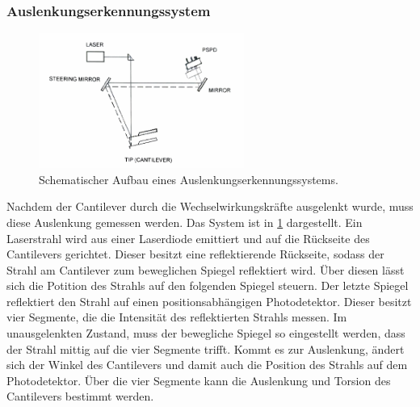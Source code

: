 \subsubsection{Auslenkungserkennungssystem}
\begin{figure}
    \centering
    \includegraphics[width=0.6\textwidth]{../assets/messmethoden/afm/02_beam}
    \caption{Schematischer Aufbau eines Auslenkungserkennungssystems. }
    \label{fig:afm-beam}
\end{figure}
Nachdem der Cantilever durch die Wechselwirkungskräfte ausgelenkt wurde, muss diese Auslenkung gemessen werden.
Das System ist in \cref{fig:afm-beam} dargestellt.
Ein Laserstrahl wird aus einer Laserdiode emittiert und auf die Rückseite des Cantilevers gerichtet.
Dieser besitzt eine reflektierende Rückseite, sodass der Strahl am Cantilever zum beweglichen Spiegel reflektiert wird.
Über diesen lässt sich die Potition des Strahls auf den folgenden Spiegel steuern.
Der letzte Spiegel reflektiert den Strahl auf einen positionsabhängigen Photodetektor.
Dieser besitzt vier Segmente, die die Intensität des reflektierten Strahls messen.
Im unausgelenkten Zustand, muss der bewegliche Spiegel so eingestellt werden, dass der Strahl mittig auf die vier
Segmente trifft.
Kommt es zur Auslenkung, ändert sich der Winkel des Cantilevers und damit auch die Position des Strahls auf dem
Photodetektor.
Über die vier Segmente kann die Auslenkung und Torsion des Cantilevers bestimmt werden.\autocite[16-18]{afm-handbuch}

